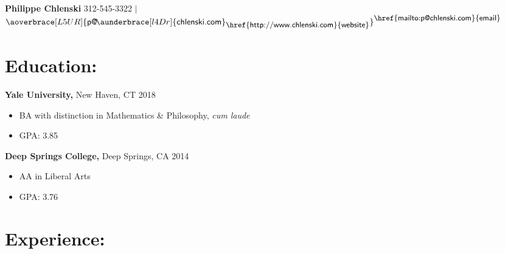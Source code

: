 \documentclass[11pt]{article}
\newcommand{\emphasized}[2]{\emphasis{#1} \medemph{#2}}
\newcommand{\heading}[1]{\section*{#1}}
\newcommand{\emphasis}[1]{\textbf{\textsf{#1}}}
\newcommand{\medemph}[1]{\textsf{#1}}
\newcommand{\link}[2]{\medemph{\hfill \small \href{#1}{#2}}}
\newenvironment{experience}{
	\begin{itemize}[leftmargin=*, topsep=0pt] %
		\setlength{\itemsep}{0pt} %
		\setlength{\parskip}{0pt} %
		\setlength{\parsep}{10pt} %
	}{
	\end{itemize}
}
\begin{document}
	
\hspace{-3cm}\Large \textsf{\textbf{Philippe Chlenski}} \normalsize \hfill \medemph{312-545-3322}  $\vert$ 
$ \aoverbrace[L5UR]{
	\medemph{p@}\hspace{-.15em}\aunderbrace[l4Dr]{
		\medemph{chlenski.com}
	}_{\link{http://www.chlenski.com}{website}}
}^{\link{mailto:p@chlenski.com}{email}} $

\vfill

\heading{Education:}

\emphasized{Yale University,}{New Haven, CT} \hfill 2018
\begin{experience}
	\item BA with distinction in Mathematics \& Philosophy, \textit{cum laude}
	\item GPA: 3.85\\
\end{experience}

\emphasized{Deep Springs College,}{Deep Springs, CA} \hfill 2014
\begin{experience}
	\item AA in Liberal Arts
	\item GPA: 3.76
\end{experience}

\heading{Experience:}
\end{document}
